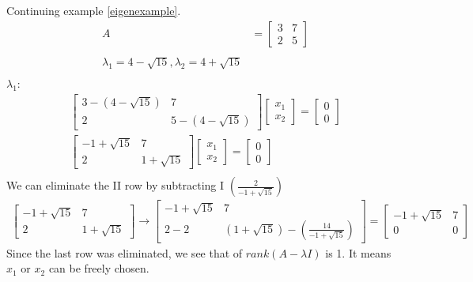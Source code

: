 \begin{example}
    Continuing  example \ref{eigenexample}.
    \begin{align*}
        A & = \begin{bmatrix}
            3 & 7 \\ 2 & 5
        \end{bmatrix}                     \\                                                                                                                                                  \\
        \lambda_1 = 4 - \sqrt{15},  \lambda_2 = 4 + \sqrt{15} \\
    \end{align*}
    \(\lambda_1\):
    \begin{align*}
        \begin{bmatrix}
            3 - (4 - \sqrt{15}) & 7 \\ 2 & 5 - ( 4 - \sqrt{15})
        \end{bmatrix}
        \begin{bmatrix}
            x_1 \\ x_2
        \end{bmatrix}= \begin{bmatrix}
            0 \\ 0
        \end{bmatrix}                            \\
        \begin{bmatrix}
            -1 + \sqrt{15} & 7 \\ 2 & 1 + \sqrt{15}
        \end{bmatrix}\begin{bmatrix}
            x_1 \\ x_2
        \end{bmatrix}= \begin{bmatrix}
            0 \\ 0
        \end{bmatrix} \\
    \end{align*}
    We can eliminate the II row by subtracting I $ \left( \frac{2}{-1 + \sqrt{15}} \right) $ \\
    \begin{align*}
        \begin{bmatrix}
            -1 + \sqrt{15} & 7 \\ 2 & 1 + \sqrt{15}
        \end{bmatrix} \rightarrow
        \begin{bmatrix}
            -1 + \sqrt{15} & 7 \\ 2 - 2 & (1 + \sqrt{15})-  \left(\frac{14}{-1 + \sqrt{15}} \right)
        \end{bmatrix} = \begin{bmatrix}
            -1 + \sqrt{15} & 7 \\ 0 & 0
        \end{bmatrix}
    \end{align*}
    Since the last row was eliminated, we see that  of $rank(A- \lambda I)$ is 1. It means $x_1$ or $x_2$ can be freely chosen.


\end{example}
